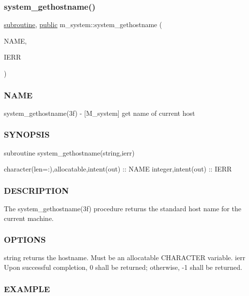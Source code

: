 \subsubsection{\texorpdfstring{system\+\_\+gethostname()}{system\_gethostname()}}
{\footnotesize\ttfamily \hyperlink{M__stopwatch_83_8txt_acfbcff50169d691ff02d4a123ed70482}{subroutine}, \hyperlink{M__stopwatch_83_8txt_a2f74811300c361e53b430611a7d1769f}{public} m\+\_\+system\+::system\+\_\+gethostname (\begin{DoxyParamCaption}\item[{\hyperlink{option__stopwatch_83_8txt_abd4b21fbbd175834027b5224bfe97e66}{character}(len=\+:), intent(out), allocatable}]{N\+A\+ME,  }\item[{integer, intent(out)}]{I\+E\+RR }\end{DoxyParamCaption})}



\subsubsection*{N\+A\+ME}

system\+\_\+gethostname(3f) -\/ \mbox{[}M\+\_\+system\mbox{]} get name of current host \subsubsection*{S\+Y\+N\+O\+P\+S\+IS}

subroutine system\+\_\+gethostname(string,ierr)

character(len=\+:),allocatable,intent(out) \+:\+: N\+A\+ME integer,intent(out) \+:\+: I\+E\+RR \subsubsection*{D\+E\+S\+C\+R\+I\+P\+T\+I\+ON}

The system\+\_\+gethostname(3f) procedure returns the standard host name for the current machine.

\subsubsection*{O\+P\+T\+I\+O\+NS}

string returns the hostname. Must be an allocatable C\+H\+A\+R\+A\+C\+T\+ER variable. ierr Upon successful completion, 0 shall be returned; otherwise, -\/1 shall be returned. \subsubsection*{E\+X\+A\+M\+P\+LE}


